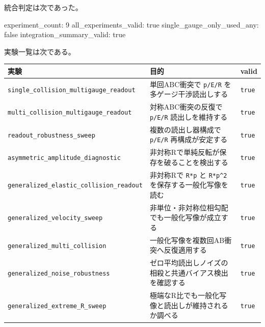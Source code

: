 \documentclass[
  a4paper,
]{article}
\newenvironment{Shaded}{}{}
\newcommand{\NormalTok}[1]{#1}
\newcounter{none} %
\begin{document}
統合判定は次であった。

\begin{Shaded}
\begin{Highlighting}[]
\NormalTok{experiment\_count: 9}
\NormalTok{all\_experiments\_valid: true}
\NormalTok{single\_gauge\_only\_used\_any: false}
\NormalTok{integration\_summary\_valid: true}
\end{Highlighting}
\end{Shaded}

実験一覧は次である。

{\def\LTcaptype{none} %
\begin{longtable}[]{@{}
  >{\raggedright\arraybackslash}p{}
  >{\raggedright\arraybackslash}p{}
  >{\raggedright\arraybackslash}p{}@{}}
\toprule\noalign{}
\begin{minipage}[b]{\linewidth}\raggedright
実験
\end{minipage} & \begin{minipage}[b]{\linewidth}\raggedright
目的
\end{minipage} & \begin{minipage}[b]{\linewidth}\raggedright
valid
\end{minipage} \\
\midrule\noalign{}
\endhead
\bottomrule\noalign{}
\endlastfoot
\texttt{single\_collision\_multigauge\_readout} & 単回ABC衝突で
\texttt{p/E/R} を多ゲージ干渉読出しする & \texttt{true} \\
\texttt{multi\_collision\_multigauge\_readout} & 対称ABC衝突の反復で
\texttt{p/E/R} 読出しを維持する & \texttt{true} \\
\texttt{readout\_robustness\_sweep} & 複数の読出し器構成で
\texttt{p/E/R} 再構成が安定する & \texttt{true} \\
\texttt{asymmetric\_amplitude\_diagnostic} &
非対称Rで単純反転が保存を破ることを検出する & \texttt{true} \\
\texttt{generalized\_elastic\_collision\_readout} & 非対称Rで
\texttt{R*p} と \texttt{R*p\^{}2} を保存する一般化写像を読む &
\texttt{true} \\
\texttt{generalized\_velocity\_sweep} &
非単位・非対称位相勾配でも一般化写像が成立する & \texttt{true} \\
\texttt{generalized\_multi\_collision} &
一般化写像を複数回AB衝突へ反復適用する & \texttt{true} \\
\texttt{generalized\_noise\_robustness} &
ゼロ平均読出しノイズの相殺と共通バイアス検出を確認する &
\texttt{true} \\
\texttt{generalized\_extreme\_R\_sweep} &
極端なR比でも一般化写像と読出しが維持されるか調べる & \texttt{true} \\
\end{longtable}
}
\end{document}

